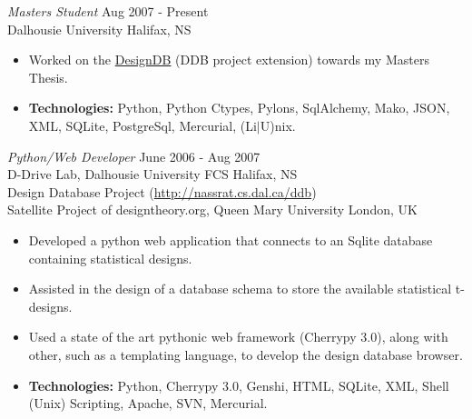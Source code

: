\documentclass[line,margin]{res}
\begin{document}
\begin{resume}
   {\sl Masters Student} \hfill Aug 2007 - Present \\
     Dalhousie University \hfill Halifax, NS \smallskip
      \begin{itemize}  \itemsep -2pt %
       \item Worked on the \href{http://designdb.org}{DesignDB} (DDB project extension)
       towards my Masters Thesis.
    \end{itemize} 

\newpage
\opening
\addvspace{\sectionskip}

      \begin{itemize}  \itemsep -2pt %
       \item {\bf Technologies:} \hspace{1pt} 
        Python, Python Ctypes, Pylons, SqlAlchemy, Mako, JSON, \newline 
        \hspace*{72pt} XML, SQLite, PostgreSql, Mercurial, 
        (Li$|$U)nix.
    \end{itemize} 

    {\sl Python/Web Developer} \hfill June 2006 - Aug 2007 \\
    D-Drive Lab, Dalhousie University FCS \hfill Halifax, NS \\
    Design Database Project (\url{http://nassrat.cs.dal.ca/ddb})\\
    Satellite Project of designtheory.org, 
    Queen Mary University \hfill London, UK \smallskip
        \begin{itemize}  \itemsep -2pt %
    \item Developed a python web application that connects to an Sqlite
    database \\ containing statistical designs.
    \item Assisted in the design of a database schema to store the available
    statistical t-designs.
    \item Used a state of the art pythonic web framework (Cherrypy 3.0), 
    along with other, such as a templating language, to develop the design 
    database browser. 
    \item {\bf Technologies:} \hspace{1pt} 
        Python, Cherrypy 3.0, Genshi, HTML, SQLite, XML, \newline
        \hspace*{72pt} Shell (Unix) Scripting, Apache, SVN, Mercurial.
        \end{itemize}


\end{resume}
\end{document}
